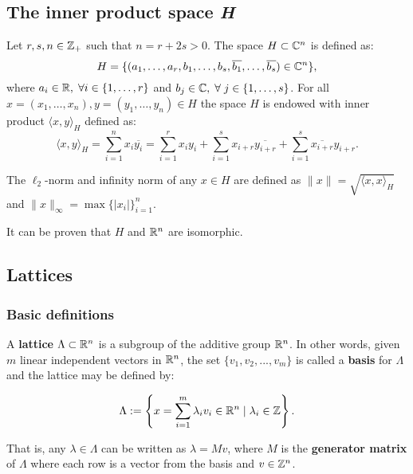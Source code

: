 \documentclass[a4paper,12pt]{article}
\begin{document}
\subsection{The inner product space \emph{H}}
\label{sec:orgc2dd889}
\begin{definition}
  \label{definition:the-h-space}
  Let $r,s,n \in \mathbb{Z}_+$ such that $n = r + 2s > 0$. The space $H \subset \mathbb{C}^n$ is defined
  as:
  \begin{equation*}
    H = \{(a_1,\dots, a_r, b_1,\dots, b_s, \overline{b_1}, \dots, \overline{b_s}) \in \mathbb{C}^n\},
  \end{equation*}
  where $a_i \in \mathbb{R}, \; \forall i \in \{1,\dots,r\}$ and $b_j \in \mathbb{C}, \; \forall \; j \in \{1,\dots,
  s\}$. For all $x = \left(x_1, \dots, x_n\right), y = \left(y_1, \dots, y_n\right) \in H$ the space
  $H$ is endowed with inner product $\langle {x,y} \rangle_H$ defined as:
  \begin{equation*}
    \langle {x,y} \rangle_H = \sum_{i=1}^n{x_i \overline{y_i}} = \sum_{i=1}^r{x_i y_i} + \sum_{i=1}^s{x_{i+r} \overline{y_{i+r}}} + \sum_{i=1}^s{\overline{x_{i+r}} y_{i+r}}.
  \end{equation*}

  The $\ell_2$-norm and infinity norm of any $x \in H$ are defined as $\|x\| =
  \sqrt{\langle{x,x}\rangle_H}$ and $\|x\|_\infty = \max{\{ |x_i| \}}_{i=1}^n $.
\end{definition}

It can be proven that \(H\) and \(\mathbb{R}^n\) are isomorphic.
\subsection{Lattices}
\label{sec:org965793e}
\subsubsection{Basic definitions}
\label{sec:org86bc978}
\begin{definition}
  A \textbf{lattice} $\Lambda \subset \mathbb{R}^n$ is a subgroup of the additive group $\mathbb{R}^n$.  In other words, given $m$ linear independent vectors in $\mathbb{R}^n$, the set
  $\{v_1, v_2, ..., v_m\}$ is called a \textbf{basis} for $\Lambda$ and the lattice may be defined
  by:

  \begin{equation*}
    \Lambda := \left\{x = \sum_{i=1}^m{\lambda_iv_i} \in \mathbb{R}^n \; | \; \lambda_i \in \mathbb{Z}\right\}.
  \end{equation*}

  That is, any $\lambda \in \Lambda$ can be written as $\lambda = Mv$, where $M$ is the
  \textbf{generator matrix} of $\Lambda$ where each row is a vector from the basis and
  $v \in \mathbb{Z}^n$.
\end{definition}
\end{document}
